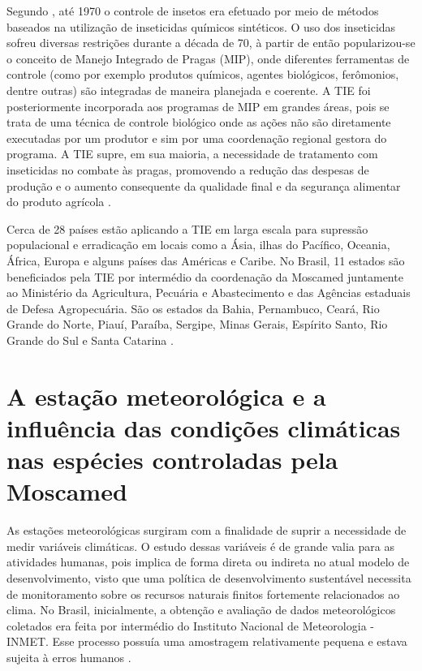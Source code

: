 Segundo , até 1970 o controle de insetos era efetuado por meio de métodos baseados na utilização de inseticidas químicos sintéticos. O uso dos inseticidas sofreu diversas restrições durante a década de 70, à partir de então popularizou-se o conceito de Manejo Integrado de Pragas (MIP), onde diferentes ferramentas de controle (como por exemplo produtos químicos, agentes biológicos, ferômonios, dentre outras) são integradas de maneira planejada e coerente. A TIE foi posteriormente incorporada aos programas de MIP em grandes áreas, pois se trata de uma técnica de controle biológico onde as ações não são diretamente executadas por um produtor e sim por uma coordenação regional gestora do programa. A TIE supre, em sua maioria, a necessidade de tratamento com inseticidas no combate às pragas, promovendo a redução das despesas de produção e o aumento consequente da qualidade final e da segurança alimentar do produto agrícola \cite{MOSCAMED2003CTI}.

Cerca de 28 países estão aplicando a TIE em larga escala para supressão populacional e erradicação em locais como a Ásia, ilhas do Pacífico, Oceania, África, Europa e alguns países das Américas e Caribe. No Brasil, 11 estados são beneficiados pela TIE por intermédio da coordenação da Moscamed juntamente ao Ministério da Agricultura, Pecuária e Abastecimento e das Agências estaduais de Defesa Agropecuária. São os estados da Bahia, Pernambuco, Ceará, Rio Grande do Norte, Piauí, Paraíba, Sergipe, Minas Gerais, Espírito Santo, Rio Grande do Sul e Santa Catarina \cite{MOSCAMEDINST2003, MOSCAMED2003CTI}.


\section{A estação meteorológica e a influência das condições climáticas nas espécies controladas pela Moscamed}

As estações meteorológicas surgiram com a finalidade de suprir a necessidade de medir variáveis climáticas. O estudo dessas variáveis é de grande valia para as atividades humanas, pois implica de forma direta ou indireta no atual modelo de desenvolvimento, visto que uma política de desenvolvimento sustentável necessita de monitoramento sobre os recursos naturais finitos fortemente relacionados ao clima. No Brasil, inicialmente, a obtenção e avaliação de dados meteorológicos coletados era feita por intermédio do Instituto Nacional de Meteorologia - INMET. Esse processo possuía uma amostragem relativamente pequena e estava sujeita à erros humanos \cite{torres2015aquisicao}.
  
